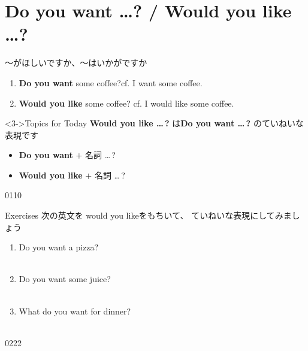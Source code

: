 \documentclass[aspectratio=169,xcolor={dvipsnames,table}]{beamer}
\begin{document}
\section{Do you want \ldots ? / Would you like \ldots ?}
\begin{frame}[plain]{～がほしいですか、～はいかがですか}
\large
 \begin{enumerate}
  \item<1-> \textbf{Do you want} some coffee?\hfill{\scriptsize cf. I want some coffee.}
  \item<2-> \textbf{Would you like} some coffee? \hfill{\scriptsize cf. I would like some coffee.}
 \end{enumerate}

\bigskip

\begin{block}<3->{Topics for Today}\small
\textbf{Would you like \ldots\,?}\,\,は\textbf{Do you want \ldots\,?}\,\,のていねいな表現です
\begin{itemize}[square]\small
 \item \textbf{Do you want} $+$ 名詞 \ldots\,?
 \item \textbf{Would you like} $+$ 名詞 \ldots\,?
       \end{itemize}
\end{block}
\hfill{\tiny 0110}\,{\scriptsize {}}

\end{frame}
\begin{frame}[plain]{Exercises}
次の英文を would you likeをもちいて、 ていねいな表現にしてみましょう
 \begin{enumerate}
  \item Do you want a pizza?\\
\\
  \item Do you want some juice?\\
\\
  \item What do you want for dinner?\\
\\
 \end{enumerate}

\hfill{\tiny 0222}\,{\scriptsize {}}

\end{frame}
\end{document}
